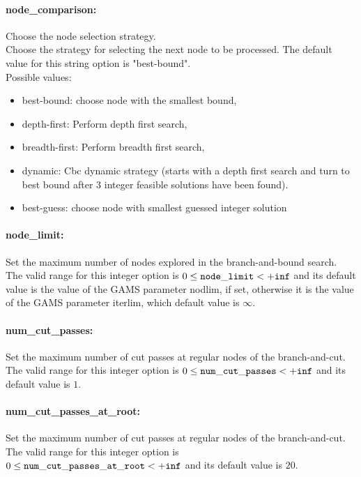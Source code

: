 \paragraph{node\_comparison:}\label{sec:node_comparison} Choose the node selection strategy. $\;$ \\
 Choose the strategy for selecting the next node
to be processed.
The default value for this string option is "best-bound".
\\ 
Possible values:
\begin{itemize}
   \item best-bound: choose node with the smallest bound,
   \item depth-first: Perform depth first search,
   \item breadth-first: Perform breadth first search,
   \item dynamic: Cbc dynamic strategy (starts with a depth first
search and turn to best bound after 3 integer
feasible solutions have been found).
   \item best-guess: choose node with smallest guessed integer
solution
\end{itemize}

\paragraph{node\_limit:}\label{sec:node_limit} Set the maximum number of nodes explored in the branch-and-bound search. $\;$ \\
 The valid range for this integer option is
$0 \le {\tt node\_limit } <  {\tt +inf}$
and its default value is the value of the GAMS parameter nodlim, if set, otherwise it is the value of the GAMS parameter iterlim, which default value is $\infty$.


\paragraph{num\_cut\_passes:}\label{sec:num_cut_passes} Set the maximum number of cut passes at regular nodes of the branch-and-cut. $\;$ \\
 The valid range for this integer option is
$0 \le {\tt num\_cut\_passes } <  {\tt +inf}$
and its default value is $1$.


\paragraph{num\_cut\_passes\_at\_root:}\label{sec:num_cut_passes_at_root} Set the maximum number of cut passes at regular nodes of the branch-and-cut. $\;$ \\
 The valid range for this integer option is
$0 \le {\tt num\_cut\_passes\_at\_root } <  {\tt +inf}$
and its default value is $20$.


